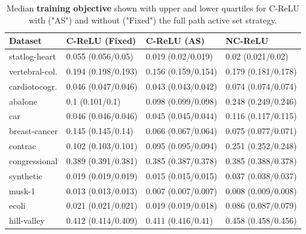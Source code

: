 \begin{table}
	\centering
	\begin{tabular}{llll} \toprule
		\textbf{Dataset} & \textbf{C-ReLU (Fixed)} & \textbf{C-ReLU (AS) } & \textbf{NC-ReLU}    \\ \midrule
		statlog-heart    & 0.055 (0.056/0.05)      & 0.019 (0.02/0.019)    & 0.02 (0.021/0.02)   \\
		vertebral-col.   & 0.194 (0.198/0.193)     & 0.156 (0.159/0.154)   & 0.179 (0.181/0.178) \\
		cardiotocogr.    & 0.046 (0.047/0.046)     & 0.043 (0.043/0.042)   & 0.074 (0.074/0.074) \\
		abalone          & 0.1 (0.101/0.1)         & 0.098 (0.099/0.098)   & 0.248 (0.249/0.246) \\
		car              & 0.046 (0.046/0.046)     & 0.045 (0.045/0.044)   & 0.116 (0.117/0.115) \\
		breast-cancer    & 0.145 (0.145/0.14)      & 0.066 (0.067/0.064)   & 0.075 (0.077/0.071) \\
		contrac          & 0.102 (0.103/0.101)     & 0.095 (0.095/0.094)   & 0.251 (0.252/0.248) \\
		congressional    & 0.389 (0.391/0.381)     & 0.385 (0.387/0.378)   & 0.385 (0.388/0.378) \\
		synthetic        & 0.019 (0.019/0.019)     & 0.015 (0.015/0.015)   & 0.037 (0.038/0.037) \\
		musk-1           & 0.013 (0.013/0.013)     & 0.007 (0.007/0.007)   & 0.008 (0.009/0.008) \\
		ecoli            & 0.021 (0.021/0.021)     & 0.019 (0.019/0.018)   & 0.086 (0.087/0.079) \\
		hill-valley      & 0.412 (0.414/0.409)     & 0.411 (0.416/0.41)    & 0.458 (0.458/0.456) \\ \bottomrule
	\end{tabular}
	\caption{Median \textbf{training objective} shown with upper and lower quartiles for C-ReLU with ("AS") and without ("Fixed") the full path active set strategy.}%
	\label{table:active-set-relu-obj}
\end{table}

